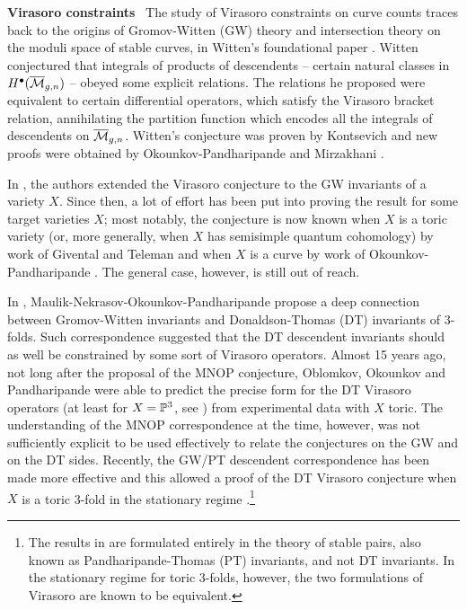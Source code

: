 \documentclass[a4paper, 12pt]{amsart}
\begin{document}
\noindent\textbf{Virasoro constraints} \
The study of Virasoro constraints on curve counts traces back to the origins of Gromov-Witten (GW) theory and intersection theory on the moduli space of stable curves, in Witten's foundational paper \cite{witten}. Witten conjectured that integrals of products of descendents -- certain natural classes in $H^\bullet(\overline {\mathcal{M}}_{g,n})$ -- obeyed some explicit relations. The relations he proposed were equivalent to certain differential operators,  which satisfy the Virasoro bracket relation, annihilating the partition function which encodes all the integrals of descendents on $\overline {\mathcal{M}}_{g,n}$. Witten's conjecture was proven by Kontsevich \cite{kontsevich} and new proofs were obtained by Okounkov-Pandharipande \cite{OPwitten} and Mirzakhani \cite{mirzakhani}.

In \cite{ehx}, the authors extended the Virasoro conjecture to the GW invariants of a variety $X$. Since then, a lot of effort has been put into proving the result for some target varieties $X$; most notably, the conjecture is now known when $X$ is a toric variety (or, more generally, when $X$ has semisimple quantum cohomology) by work of Givental and Teleman \cite{givental, teleman} and when $X$ is a curve by work of Okounkov-Pandharipande \cite{OP}. The general case, however, is still out of reach. 

In \cite{mnop1, mnop2}, Maulik-Nekrasov-Okounkov-Pandharipande propose a \allowbreak deep connection between Gromov-Witten invariants and Donaldson-Thomas (DT) invariants of 3-folds. Such correspondence suggested that the DT descendent invariants should as well be constrained by some sort of Virasoro operators. Almost 15 years ago, not long after the proposal of the MNOP conjecture, Oblomkov, Okounkov and Pandharipande were able to predict the precise form for the DT Virasoro operators (at least for $X=\mathbb{P}^3$, see \cite[Conjecture 8]{survey}) from experimental data with $X$ toric. The understanding of the MNOP correspondence at the time, however, was not sufficiently explicit to be used effectively to relate the conjectures on the GW and on the DT sides. Recently, the GW/PT descendent correspondence has been made more effective and this allowed a proof of the DT Virasoro conjecture when $X$ is a toric 3-fold in the stationary regime \cite{moop}.\footnote{The results in \cite{moop} are formulated entirely in the theory of stable pairs, also known as Pandharipande-Thomas (PT) invariants, and not DT invariants. In the stationary regime for toric 3-folds, however, the two formulations of Virasoro are known to be equivalent. } 
\end{document}
